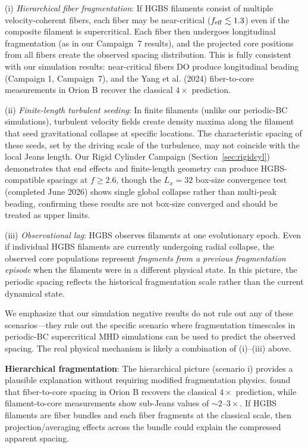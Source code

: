 \documentclass[twoside,twocolumn]{mnras}
\begin{document}
(i) \textit{Hierarchical fiber fragmentation}: If HGBS filaments consist of multiple velocity-coherent fibers, each fiber may be near-critical ($f_{\rm eff} \lesssim 1.3$) even if the composite filament is supercritical. Each fiber then undergoes longitudinal fragmentation (as in our Campaign~7 results), and the projected core positions from all fibers create the observed spacing distribution. This is fully consistent with our simulation results: near-critical fibers DO produce longitudinal beading (Campaign 1, Campaign~7), and the Yang et al. (2024) fiber-to-core measurements in Orion B recover the classical $4\times$ prediction.

(ii) \textit{Finite-length turbulent seeding}: In finite filaments (unlike our periodic-BC simulations), turbulent velocity fields create density maxima along the filament that seed gravitational collapse at specific locations. The characteristic spacing of these seeds, set by the driving scale of the turbulence, may not coincide with the local Jeans length. Our Rigid Cylinder Campaign (Section~\ref{sec:rigidcyl}) demonstrates that end effects and finite-length geometry can produce HGBS-compatible spacings at $f \geq 2.6$, though the $L_x = 32$ box-size convergence test (completed June 2026) shows single global collapse rather than multi-peak beading, confirming these results are not box-size converged and should be treated as upper limits.

(iii) \textit{Observational lag}: HGBS observes filaments at one evolutionary epoch. Even if individual HGBS filaments are currently undergoing radial collapse, the observed core populations represent \textit{fragments from a previous fragmentation episode} when the filaments were in a different physical state. In this picture, the periodic spacing reflects the historical fragmentation scale rather than the current dynamical state.

We emphasize that our simulation negative results do not rule out any of these scenarios---they rule out the specific scenario where fragmentation timescales in periodic-BC supercritical MHD simulations can be used to predict the observed spacing. The real physical mechanism is likely a combination of (i)--(iii) above.

\textbf{Hierarchical fragmentation}: The hierarchical picture (scenario i) provides a plausible explanation without requiring modified fragmentation physics. \citet{Yang2024} found that fiber-to-core spacing in Orion B recovers the classical $4\times$ prediction, while filament-to-core measurements show sub-Jeans values of $\sim2$--$3\times$. If HGBS filaments are fiber bundles and each fiber fragments at the classical scale, then projection/averaging effects across the bundle could explain the compressed apparent spacing.
\end{document}
